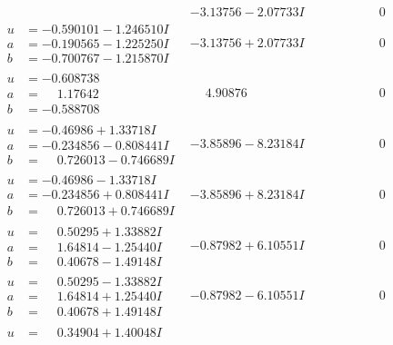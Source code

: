 \documentclass[1p]{elsarticle_modified}
\theoremstyle{definition}
\begin{document}
$$\begin{array}{c|c|c}
 & -3.13756 - 2.07733 I & \phantom{-0.000000 } 0 \\ \hline\begin{aligned}
u &= -0.590101 - 1.246510 I \\
a &= -0.190565 - 1.225250 I \\
b &= -0.700767 - 1.215870 I\end{aligned}
 & -3.13756 + 2.07733 I & \phantom{-0.000000 } 0 \\ \hline\begin{aligned}
u &= -0.608738\phantom{ +0.000000I} \\
a &= \phantom{-}1.17642\phantom{ +0.000000I} \\
b &= -0.588708\phantom{ +0.000000I}\end{aligned}
 & \phantom{-}4.90876\phantom{ +0.000000I} & \phantom{-0.000000 } 0 \\ \hline\begin{aligned}
u &= -0.46986 + 1.33718 I \\
a &= -0.234856 - 0.808441 I \\
b &= \phantom{-}0.726013 - 0.746689 I\end{aligned}
 & -3.85896 - 8.23184 I & \phantom{-0.000000 } 0 \\ \hline\begin{aligned}
u &= -0.46986 - 1.33718 I \\
a &= -0.234856 + 0.808441 I \\
b &= \phantom{-}0.726013 + 0.746689 I\end{aligned}
 & -3.85896 + 8.23184 I & \phantom{-0.000000 } 0 \\ \hline\begin{aligned}
u &= \phantom{-}0.50295 + 1.33882 I \\
a &= \phantom{-}1.64814 - 1.25440 I \\
b &= \phantom{-}0.40678 - 1.49148 I\end{aligned}
 & -0.87982 + 6.10551 I & \phantom{-0.000000 } 0 \\ \hline\begin{aligned}
u &= \phantom{-}0.50295 - 1.33882 I \\
a &= \phantom{-}1.64814 + 1.25440 I \\
b &= \phantom{-}0.40678 + 1.49148 I\end{aligned}
 & -0.87982 - 6.10551 I & \phantom{-0.000000 } 0 \\ \hline\begin{aligned}
u &= \phantom{-}0.34904 + 1.40048 I \\

\end{aligned}
\end{array}$$
\end{document}
